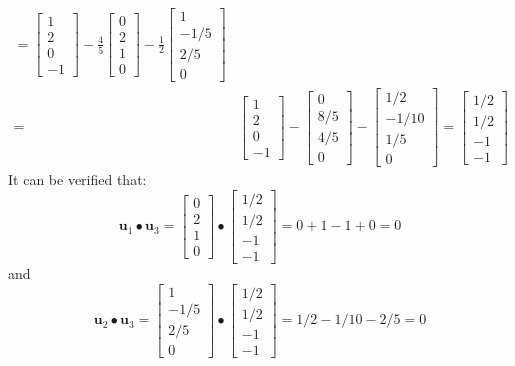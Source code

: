 \documentclass{article}
\begin{document}
\begin{description}
\begin{align*}
= \begin{bmatrix} 1 \\ 2 \\ 0 \\ -1 \end{bmatrix} - \frac{4}{5}\begin{bmatrix} 0 \\ 2 \\ 1 \\ 0 \end{bmatrix} - \frac{1}{2}\begin{bmatrix} 1 \\ -1/5 \\ 2/5 \\ 0 \end{bmatrix} \\
= & \begin{bmatrix} 1 \\ 2 \\ 0 \\ -1 \end{bmatrix} - \begin{bmatrix} 0 \\ 8/5 \\ 4/5 \\ 0 \end{bmatrix} - \begin{bmatrix} 1/2 \\ -1/10 \\ 1/5 \\ 0 \end{bmatrix} 
= \begin{bmatrix} 1/2 \\ 1/2 \\ -1 \\ -1 \end{bmatrix} 
\end{align*}
It can be verified that:
\[\mathbf{u}_1 \bullet \mathbf{u}_3 = \begin{bmatrix} 0 \\ 2 \\ 1 \\ 0 \end{bmatrix} \bullet \begin{bmatrix} 1/2 \\ 1/2 \\ -1 \\ -1 \end{bmatrix} = 0 + 1 - 1 + 0 = 0\]
and
\[\mathbf{u}_2 \bullet \mathbf{u}_3 = \begin{bmatrix} 1 \\ -1/5 \\ 2/5 \\ 0 \end{bmatrix} \bullet \begin{bmatrix} 1/2 \\ 1/2 \\ -1 \\ -1 \end{bmatrix} = 1/2 - 1/10 - 2/5 = 0\]

\end{description}
\end{document}
